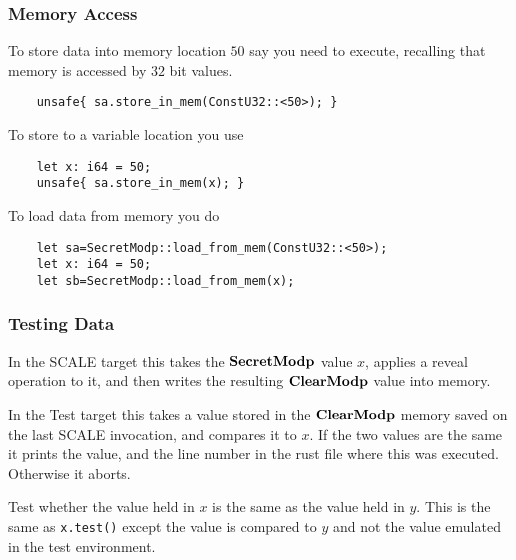 \subsubsection{Memory Access}
To store data into memory location $50$ say you need to execute,
recalling that memory is accessed by $32$ bit values.
\begin{lstlisting}
    unsafe{ sa.store_in_mem(ConstU32::<50>); }
\end{lstlisting}
To store to a variable location you use
\begin{lstlisting}
    let x: i64 = 50;
    unsafe{ sa.store_in_mem(x); }
\end{lstlisting}

To load data from memory you do
\begin{lstlisting}
    let sa=SecretModp::load_from_mem(ConstU32::<50>);
    let x: i64 = 50;
    let sb=SecretModp::load_from_mem(x);
\end{lstlisting}


\subsubsection{Testing Data}
In the SCALE target this takes the $\mathbf{SecretModp}$ value $x$,
applies a reveal operation to it, and then writes the
resulting $\mathbf{ClearModp}$ value into memory.

In the Test target this takes a value stored in the $\mathbf{ClearModp}$
memory saved on the last SCALE invocation, and compares it to
$x$. If the two values are the same it prints the value, and the
line number in the rust file where this was executed.
Otherwise it aborts.

Test whether the value held in $x$ is the same as the value held in $y$.
This is the same as \verb|x.test()| except the value is compared to
$y$ and not the value emulated in the test environment.
